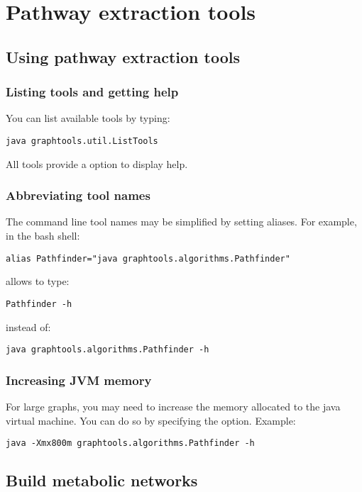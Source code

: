 \chapter{Pathway extraction tools}

\section{Using pathway extraction tools}

\subsection{Listing tools and getting help}
You can list available tools by typing:

\begin{verbatim}
java graphtools.util.ListTools
\end{verbatim}

All tools provide a  option to display help.

\subsection{Abbreviating tool names}
The command line tool names may be simplified by setting aliases.
For example, in the bash shell:
\begin{verbatim}
alias Pathfinder="java graphtools.algorithms.Pathfinder"
\end{verbatim}
allows to type:
\begin{verbatim}
Pathfinder -h
\end{verbatim}
instead of:
\begin{verbatim}
java graphtools.algorithms.Pathfinder -h
\end{verbatim}

\subsection{Increasing JVM memory}
For large graphs, you may need to increase the memory allocated to the java virtual machine.
You can do so by specifying the  option.
Example:
\begin{verbatim}
java -Xmx800m graphtools.algorithms.Pathfinder -h
\end{verbatim}

\section{Build metabolic networks}

